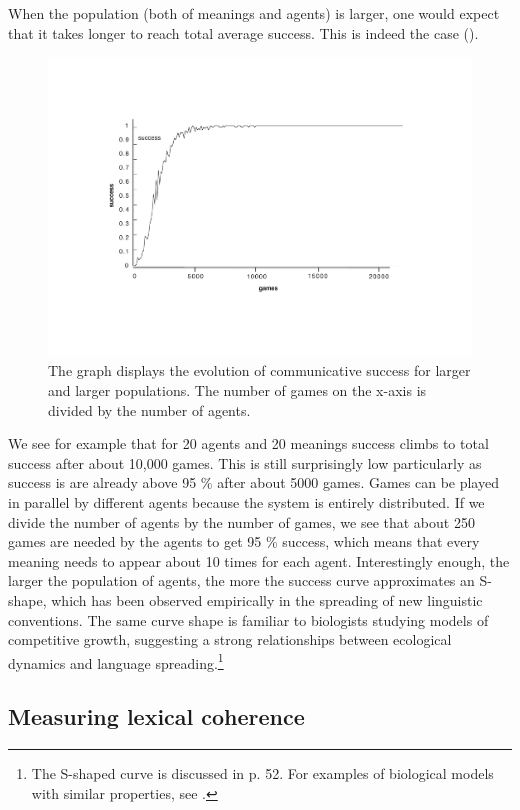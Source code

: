 When the population (both of meanings and agents) is larger, 
one would expect that it takes longer to reach total average
success. This is indeed the case (). 

\begin{figure}[htbp]
  \centerline{\includegraphics[width=\textwidth]{chap5/figs/larger.pdf}}
\caption{\label{larger} 
The graph displays the evolution of communicative success
for larger and larger populations. The
number of games on the x-axis
is divided by the number of agents. }
\end{figure}
We see for example that for 20 agents and 20 meanings 
success climbs to total success after about 10,000 games.
This is still surprisingly low particularly as
success is
are already above 95 \% after about 5000 games. Games can be played
in parallel by different agents because the system 
is entirely distributed. If we divide
the number of agents by the number of games, we see that about 250
games are needed by the agents to get 95 \% success, which means
that every meaning needs to appear about 10 times for each agent. 
Interestingly enough, the larger the population of agents, 
the more the success curve approximates an 
S-shape, which has 
been observed empirically in the spreading of new
linguistic conventions. The same curve shape is familiar to
biologists studying models of competitive growth, suggesting 
a strong relationships between ecological dynamics and language
spreading.\footnote{The S-shaped curve is discussed in \cite{McMahon:1994} p. 52. For examples
of biological models with similar properties, see \cite{May:1976}.}

\subsection{Measuring lexical coherence} 

